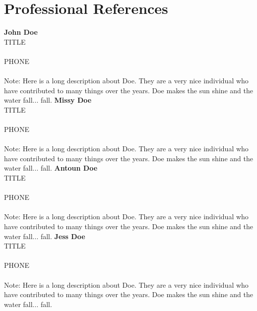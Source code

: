\section{Professional References}
\textbf{John Doe} \\
TITLE \\
 \\
PHONE \\
 \\
Note: Here is a long description about Doe. They are a very nice individual who have contributed to many things over the years. Doe makes the sun shine and the water fall... fall.
\vfill
\textbf{Missy Doe} \\
TITLE \\
 \\
PHONE \\
 \\
Note: Here is a long description about Doe. They are a very nice individual who have contributed to many things over the years. Doe makes the sun shine and the water fall... fall.
\vfill
\textbf{Antoun Doe} \\
TITLE \\
 \\
PHONE \\
 \\
Note: Here is a long description about Doe. They are a very nice individual who have contributed to many things over the years. Doe makes the sun shine and the water fall... fall.
\vfill
\textbf{Jess Doe} \\
TITLE \\
 \\
PHONE \\
 \\
Note: Here is a long description about Doe. They are a very nice individual who have contributed to many things over the years. Doe makes the sun shine and the water fall... fall.